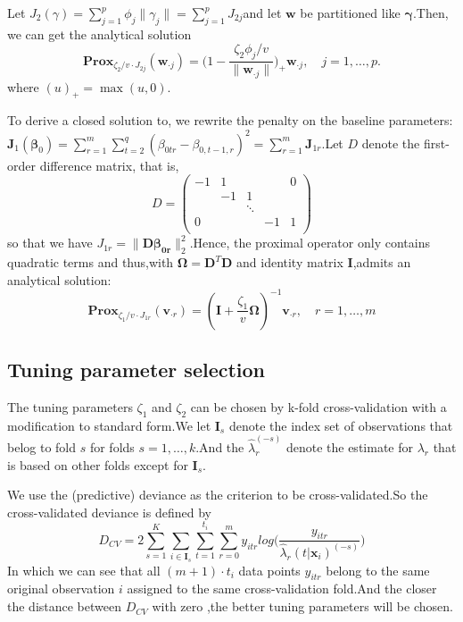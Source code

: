 \documentclass[]{article}
\begin{document}
    Let $J_2(\gamma) = \sum_{j=1}^p\phi_j\rVert\gamma_j\rVert=\sum_{j=1}^pJ_{2j}$and let $\bm{w}$ be partitioned like $\bm{\gamma}$.Then, we can get the analytical solution
    \begin{equation}
    \mathbf{Prox}_{\zeta_2/v\cdot J_{2j}}(\bm{w}_{\cdot j}) = \bigg(1-\frac{\zeta_2\phi_j/v}{\rVert\bm{w}_{\cdot j}\rVert}\bigg)_+\bm{w}_{\cdot j},\quad j = 1,\dots,p.
    \end{equation}
    where $(u)_+=\max (u,0)$.
    
    To derive a closed solution to, we rewrite the penalty on the baseline parameters:$\mathbf{J}_1(\bm{\beta}_0) = \sum_{r=1}^{m}\sum_{t=2}^q(\beta_{0tr}-\beta_{0,t-1,r})^2=\sum_{r=1}^m\mathbf{J}_{1r}$.Let $D$ denote the first-order difference matrix, that is,
    \[D=
    \left(
    \begin{array}{ccccc}
    -1 &  1 &   &  & 0 \\
    & -1 & 1 &  &  \\
    &    & \ddots  & & \\
    0  &    &   & -1 & 1 \\
    \end{array}
    \right)\]
    so that we have $J_{1r}=\rVert\bm{D\beta_{0r}}\rVert_2^2$.Hence, the proximal operator only contains quadratic terms and thus,with $\bm{\Omega}= \bm{D}^T\bm{D}$ and identity matrix $\bm{I}$,admits an analytical solution:
    \begin{equation}
    \mathbf{Prox}_{\zeta_1/v\cdot J_{1r}}(\bm{v}_{\cdot r}) = (\bm{I}+\frac{\zeta_1}{v}\bm{\Omega})^{-1}\bm{v}_{\cdot r},\quad r = 1,\dots,m
    \end{equation}
    \subsection{Tuning parameter selection}
    The tuning parameters $\zeta_1$ and $\zeta_2$ can be chosen by k-fold cross-validation with a modification to standard form.We let $\mathbf{I}_s$ denote the index set of observations that belog to fold $s$ for folds $s = 1,\dots,k$.And the $\hat{\lambda}_r^{(-s)}$ denote the estimate for $\lambda_r$ that is based on other folds except for $\mathbf{I}_s$.
    
    We use the (predictive) deviance as the criterion to be cross-validated.So the cross-validated deviance is defined by
    \begin{equation}
    D_{CV} = 2\sum_{s=1}^K\sum_{i\in \mathbf{I}_s}\sum_{t=1}^{t_i}\sum_{r=0}^{m}y_{itr}log\bigg(\frac{y_{itr}}{\hat{\lambda}_r(t|\mathbf{x}_i)^{(-s)}}\bigg)
    \end{equation}
    In which we can see that all $(m+1)\cdot t_i$ data points $y_{itr}$ belong to the same original observation $i$ assigned to the same cross-validation fold.And the closer the distance between $D_{CV}$ with zero ,the better tuning parameters will be chosen.
    
\end{document}
